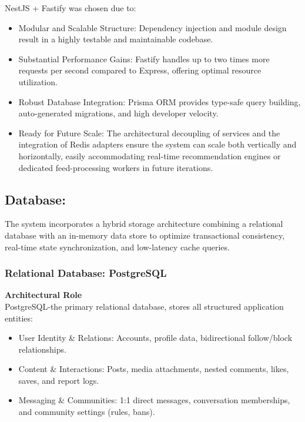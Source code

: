 NestJS + Fastify was chosen due to:
\begin{itemize}
  \item Modular and Scalable Structure: Dependency injection and module design result in a highly testable and maintainable codebase.
  \item Substantial Performance Gains: Fastify handles up to two times more requests per second compared to Express, offering optimal resource utilization.
  \item Robust Database Integration: Prisma ORM provides type-safe query building, auto-generated migrations, and high developer velocity.
  \item Ready for Future Scale: The architectural decoupling of services and the integration of Redis adapters ensure the system can scale both vertically and horizontally, easily accommodating real-time recommendation engines or dedicated feed-processing workers in future iterations.
\end{itemize}

\subsection{Database:}

The system incorporates a hybrid storage architecture combining a relational database with an in-memory data store to optimize transactional consistency, real-time state synchronization, and low-latency cache queries.

\subsubsection{Relational Database: PostgreSQL}

\medskip\noindent\textbf{Architectural Role}\\[2pt]

PostgreSQL-the primary relational database, stores all structured application entities:
\begin{itemize}
  \item User Identity \& Relations: Accounts, profile data, bidirectional follow/block relationships.
  \item Content \& Interactions: Posts, media attachments, nested comments, likes, saves, and report logs.
  \item Messaging \& Communities: 1:1 direct messages, conversation memberships, and community settings (rules, bans).
\end{itemize}

